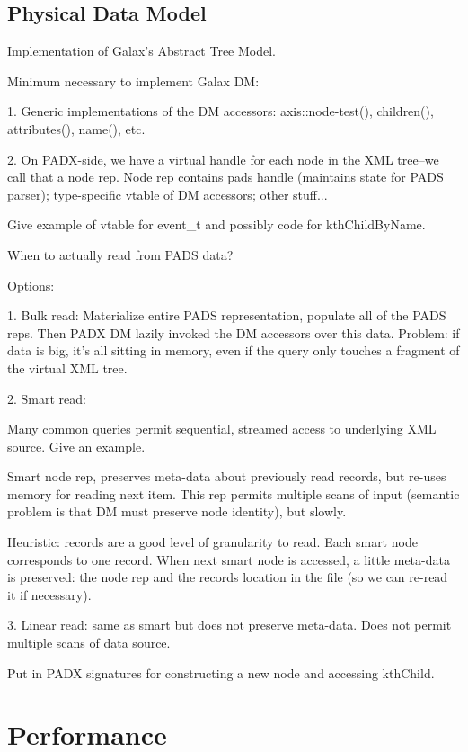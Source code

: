 \documentclass{sigplanconf}
\begin{document}
\subsection{Physical Data Model}

Implementation of Galax's Abstract Tree Model.

Minimum necessary to implement Galax DM:

1. Generic implementations of the DM accessors: axis::node-test(), children(),
   attributes(), name(), etc. 

2. On PADX-side, we have a virtual handle for each node in the XML
   tree--we call that a node rep.  Node rep contains pads handle
   (maintains state for PADS parser); type-specific vtable of DM
   accessors; other stuff...

   Give example of vtable for event\_t and possibly code for
   kthChildByName. 

When to actually read from PADS data?

Options: 

1. Bulk read: Materialize entire PADS representation, populate all of the PADS
reps.  Then PADX DM lazily invoked the DM accessors over this data.
Problem: if data is big, it's all sitting in memory, even if the query
only touches a fragment of the virtual XML tree.

2. Smart read: 

Many common queries permit sequential, streamed access to underlying
XML source.  Give an example.  

Smart node rep, preserves meta-data about previously read records, but
re-uses memory for reading next item.  This rep permits multiple scans
of input (semantic problem is that DM must preserve node identity),
but slowly. 

Heuristic: records are a good level of granularity to read.   Each
smart node corresponds to one record.  When next smart node is
accessed, a little meta-data is preserved: the node rep and the
records location in the file (so we can re-read it if necessary).

3. Linear read: same as smart but does not preserve meta-data.
   Does not permit multiple scans of data source. 

Put in PADX signatures for constructing a new node and accessing
kthChild. 

\section{Performance}
\label{section:performance}
\end{document}
